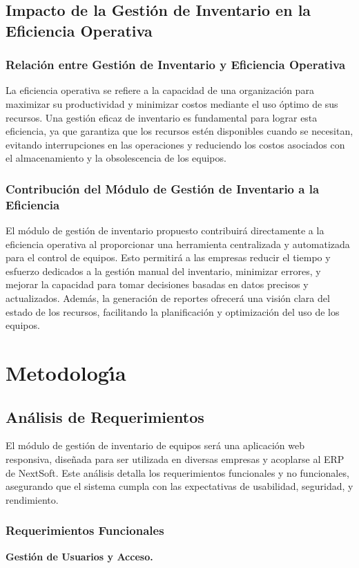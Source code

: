 \documentclass[stu, 12pt, letterpaper, donotrepeattitle, floatsintext, natbib]{apa7}
\begin{document}
\subsection{Impacto de la Gesti\'on de Inventario en la Eficiencia Operativa}
\subsubsection{Relaci\'on entre Gesti\'on de Inventario y Eficiencia Operativa}
La eficiencia operativa se refiere a la capacidad de una organizaci\'on para maximizar su productividad y minimizar costos mediante el uso \'optimo de sus recursos.
Una gesti\'on eficaz de inventario es fundamental para lograr esta eficiencia, ya que garantiza que los recursos est\'en disponibles cuando se necesitan, evitando
interrupciones en las operaciones y reduciendo los costos asociados con el almacenamiento y la obsolescencia de los equipos.
\subsubsection{Contribuci\'on del M\'odulo de Gesti\'on de Inventario a la Eficiencia}
El m\'odulo de gesti\'on de inventario propuesto contribuir\'a directamente a la eficiencia operativa al proporcionar una herramienta centralizada y automatizada
para el control de equipos. Esto permitir\'a a las empresas reducir el tiempo y esfuerzo dedicados a la gesti\'on manual del inventario, minimizar errores, y
mejorar la capacidad para tomar decisiones basadas en datos precisos y actualizados. Adem\'as, la generaci\'on de reportes ofrecer\'a una visi\'on clara del
estado de los recursos, facilitando la planificaci\'on y optimizaci\'on del uso de los equipos.
\newpage
\section{Metodolog\'{\i}a}
\subsection{An\'alisis de Requerimientos}
El m\'odulo de gesti\'on de inventario de equipos ser\'a una aplicaci\'on web responsiva, dise\~{n}ada para ser utilizada en diversas empresas y acoplarse al ERP de
NextSoft. Este an\'alisis detalla los requerimientos funcionales y no funcionales, asegurando que el sistema cumpla con las expectativas de usabilidad, seguridad,
y rendimiento.
\subsubsection{Requerimientos Funcionales}
\textbf{Gesti\'on de Usuarios y Acceso.}
\end{document}
